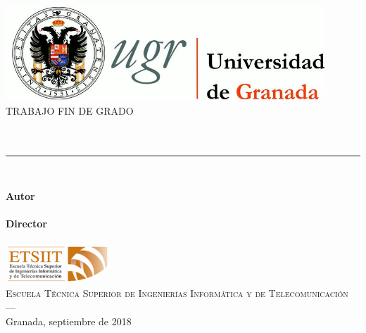 \begin{titlepage}
 
\newlength{\centeroffset}
\setlength{\centeroffset}{-0.5\oddsidemargin}
\addtolength{\centeroffset}{0.5\evensidemargin}
\thispagestyle{empty}

\noindent\hspace*{\centeroffset}\begin{minipage}{\textwidth}

\centering
\includegraphics[width=0.9\textwidth]{imagenes/logo_ugr.jpg}\\[1cm]

\textsc{ \Large TRABAJO FIN DE GRADO\\[0.2cm]}
\textsc{ \myDegree}\\[1cm]
% 
{\Huge \bfseries \myTitle \\
}
\noindent\rule[-1ex]{\textwidth}{3pt}\\[3.5ex]
\end{minipage}

\vspace{1cm}
\noindent\hspace*{\centeroffset}\begin{minipage}{\textwidth}
\centering

\textbf{Autor}\\ {\myName}\\[2.5ex]
\textbf{Director}\\ {\myProf}\\[3.5ex]
\includegraphics[width=0.3\textwidth]{imagenes/etsiit_logo.png}\\[0.5cm]
\textsc{Escuela Técnica Superior de Ingenierías Informática y de Telecomunicación}\\
\textsc{---}\\
Granada, septiembre de 2018
\end{minipage}
\end{titlepage}


